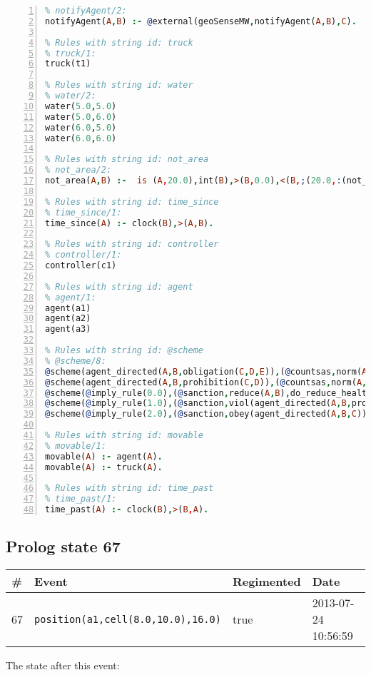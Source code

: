 \documentclass[11pt]{article}\usepackage[utf8]{inputenc}\usepackage{geometry}
\begin{document}
\begin{lstlisting}[language=Prolog, numbers=left]
% Rules with string id: notifyAgent
% notifyAgent/2:
notifyAgent(A,B) :- @external(geoSenseMW,notifyAgent(A,B),C).

% Rules with string id: truck
% truck/1:
truck(t1)

% Rules with string id: water
% water/2:
water(5.0,5.0)
water(5.0,6.0)
water(6.0,5.0)
water(6.0,6.0)

% Rules with string id: not_area
% not_area/2:
not_area(A,B) :-  is (A,20.0),int(B),>(B,0.0),<(B,;(20.0,:(not_area(A,B), is (-(B),20.0)))),int(A),>(A,0.0),<(A,;(20.0,:(area(A,B),-(int(A))))),int(B),>(A,0.0),>(B,0.0),<(A,21.0),<(B,21.0).

% Rules with string id: time_since
% time_since/1:
time_since(A) :- clock(B),>(A,B).

% Rules with string id: controller
% controller/1:
controller(c1)

% Rules with string id: agent
% agent/1:
agent(a1)
agent(a2)
agent(a3)

% Rules with string id: @scheme
% @scheme/8:
@scheme(agent_directed(A,B,obligation(C,D,E)),(@countsas,norm(A,B,F,obligation(C,D,E)),F),false,(listTrue(C)),(time_past(D)),false,[plus(viol(agent_directed(A,B,obligation(C,D,E))))|[]],[plus(obey(agent_directed(A,B,obligation(C,D,E))))|[]])
@scheme(agent_directed(A,B,prohibition(C,D)),(@countsas,norm(A,B,E,prohibition(C,D)),E),(listTrue(C)),false,(false),false,[plus(viol(agent_directed(A,B,prohibition(C,D))))|[]],[plus(obey(agent_directed(A,B,prohibition(C,D))))|[]])
@scheme(@imply_rule(0.0),(@sanction,reduce(A,B),do_reduce_health(A,B),notifyAgent(A,changed(status))),true,false,false,false,[min(reduce(A,B))|[]],[])
@scheme(@imply_rule(1.0),(@sanction,viol(agent_directed(A,B,prohibition(C,D))),do_sanction(D)),true,false,false,false,[min(viol(agent_directed(A,B,prohibition(C,D))))|[]],[])
@scheme(@imply_rule(2.0),(@sanction,obey(agent_directed(A,B,C))),true,false,false,false,[min(obey(agent_directed(A,B,C)))|[]],[])

% Rules with string id: movable
% movable/1:
movable(A) :- agent(A).
movable(A) :- truck(A).

% Rules with string id: time_past
% time_past/1:
time_past(A) :- clock(B),>(B,A).

\end{lstlisting}
\clearpage 
\subsection{Prolog state 67}
\begin{table}[ht]
\centering 
\begin{tabular}{l l l l} 
\textbf{\#} & \textbf{Event} & \textbf{Regimented} & \textbf{Date} \\ [0.5ex] 
\hline
67&\texttt{position(a1,cell(8.0,10.0),16.0)}&true&2013-07-24 10:56:59\\ [1ex] \hline\end{tabular}
\end{table}
The state after this event:
\end{document}
